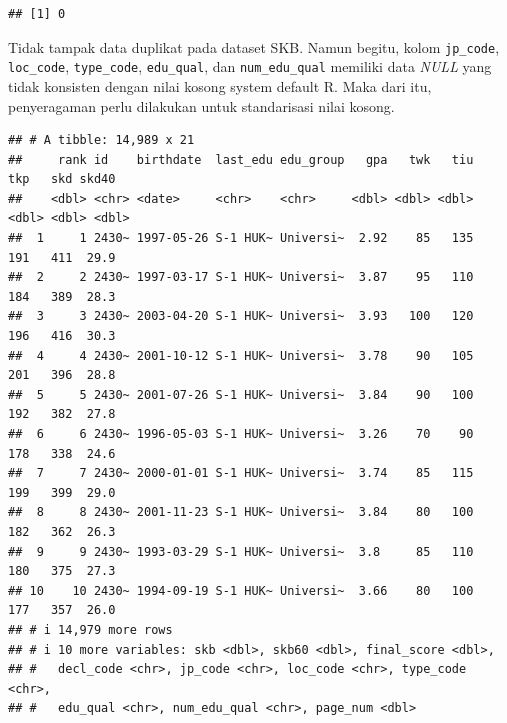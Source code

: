 \documentclass[
]{article}
\newenvironment{Shaded}{\begin{snugshade}}{\end{snugshade}}
\newcommand{\ConstantTok}[1]{\textcolor[rgb]{0.56,0.35,0.01}{#1}}
\newcommand{\FunctionTok}[1]{\textcolor[rgb]{0.13,0.29,0.53}{\textbf{#1}}}
\newcommand{\NormalTok}[1]{#1}
\newcommand{\OtherTok}[1]{\textcolor[rgb]{0.56,0.35,0.01}{#1}}
\newcommand{\SpecialCharTok}[1]{\textcolor[rgb]{0.81,0.36,0.00}{\textbf{#1}}}
\newcommand{\StringTok}[1]{\textcolor[rgb]{0.31,0.60,0.02}{#1}}
\begin{document}
\begin{verbatim}
## [1] 0
\end{verbatim}

Tidak tampak data duplikat pada dataset SKB. Namun begitu, kolom
\texttt{jp\_code}, \texttt{loc\_code}, \texttt{type\_code},
\texttt{edu\_qual}, dan \texttt{num\_edu\_qual} memiliki data
\emph{NULL} yang tidak konsisten dengan nilai kosong system default R.
Maka dari itu, penyeragaman perlu dilakukan untuk standarisasi nilai
kosong.

\begin{Shaded}
\end{Shaded}

\begin{verbatim}
## # A tibble: 14,989 x 21
##     rank id    birthdate  last_edu edu_group   gpa   twk   tiu   tkp   skd skd40
##    <dbl> <chr> <date>     <chr>    <chr>     <dbl> <dbl> <dbl> <dbl> <dbl> <dbl>
##  1     1 2430~ 1997-05-26 S-1 HUK~ Universi~  2.92    85   135   191   411  29.9
##  2     2 2430~ 1997-03-17 S-1 HUK~ Universi~  3.87    95   110   184   389  28.3
##  3     3 2430~ 2003-04-20 S-1 HUK~ Universi~  3.93   100   120   196   416  30.3
##  4     4 2430~ 2001-10-12 S-1 HUK~ Universi~  3.78    90   105   201   396  28.8
##  5     5 2430~ 2001-07-26 S-1 HUK~ Universi~  3.84    90   100   192   382  27.8
##  6     6 2430~ 1996-05-03 S-1 HUK~ Universi~  3.26    70    90   178   338  24.6
##  7     7 2430~ 2000-01-01 S-1 HUK~ Universi~  3.74    85   115   199   399  29.0
##  8     8 2430~ 2001-11-23 S-1 HUK~ Universi~  3.84    80   100   182   362  26.3
##  9     9 2430~ 1993-03-29 S-1 HUK~ Universi~  3.8     85   110   180   375  27.3
## 10    10 2430~ 1994-09-19 S-1 HUK~ Universi~  3.66    80   100   177   357  26.0
## # i 14,979 more rows
## # i 10 more variables: skb <dbl>, skb60 <dbl>, final_score <dbl>,
## #   decl_code <chr>, jp_code <chr>, loc_code <chr>, type_code <chr>,
## #   edu_qual <chr>, num_edu_qual <chr>, page_num <dbl>
\end{verbatim}
\end{document}
